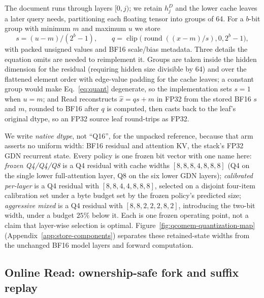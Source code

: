 \documentclass{article}
\begin{document}
The document runs through layers $[0,j)$; we retain $h_j^D$ and the lower cache
leaves a later query needs, partitioning each floating tensor into groups of 64.
For a $b$-bit group with minimum $m$ and maximum $u$ we store
\begin{equation}
 s=(u-m)/(2^b-1),\qquad q=\operatorname{clip}
 \bigl(\operatorname{round}((x-m)/s),0,2^b-1\bigr),
 \label{eq:quant}
\end{equation}
with packed unsigned values and BF16 scale/bias metadata.  Three details the
equation omits are needed to reimplement it.  Groups are taken inside the hidden
dimension for the residual (requiring hidden size divisible by 64) and over the
flattened element order with edge-value padding for the cache leaves; a constant
group would make Eq.~\ref{eq:quant} degenerate, so the implementation sets $s=1$
when $u=m$; and Read reconstructs $\hat x=qs+m$ in FP32 from the stored BF16 $s$
and $m$, rounded to BF16 after $q$ is computed, then casts back to the leaf's
original dtype, so an FP32 source leaf round-trips as FP32.

We write \emph{native dtype}, not ``Q16'', for the unpacked reference, because
that arm asserts no uniform width: BF16 residual and attention KV, the stack's
FP32 GDN recurrent state.  Every policy is one frozen bit vector with
one name here: \emph{frozen Q4/Q4/Q8} is a Q4 residual with cache widths
$[8,8,8,4,8,8,8]$ (Q4 on the single lower full-attention layer, Q8 on the six
lower GDN layers); \emph{calibrated per-layer} is a Q4 residual with
$[8,8,4,4,8,8,8]$, selected on a disjoint four-item calibration set under a byte
budget set by the frozen policy's predicted size; \emph{aggressive mixed} is a
Q4 residual with $[8,8,2,2,2,8,2]$, introducing the two-bit width, under a
budget $25\%$ below it.  Each is one frozen operating point, not a claim that
layer-wise selection is optimal.  Figure~\ref{fig:qcomem-quantization-map}
(Appendix~\ref{app:store-components}) separates these retained-state widths from
the unchanged BF16 model layers and forward computation.

\subsection{Online Read: ownership-safe fork and suffix replay}
\label{sec:read}
\end{document}
